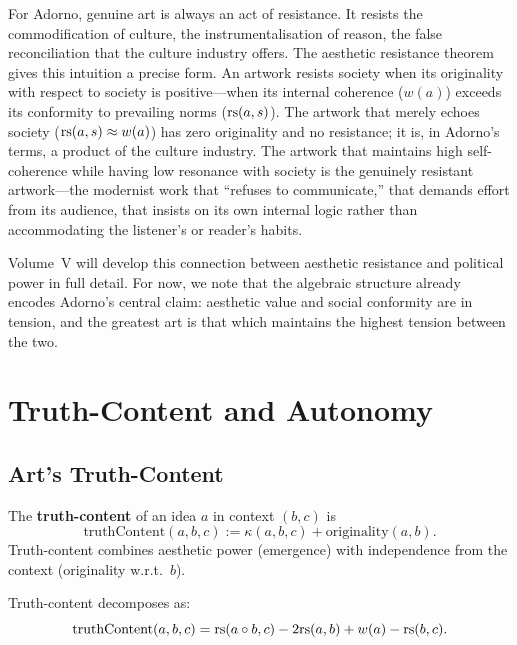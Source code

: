 \begin{interpretation}
\label{interp:adorno-resistant}
For Adorno, genuine art is always an act of resistance.  It resists the commodification of culture, the instrumentalisation of reason, the false reconciliation that the culture industry offers.  The aesthetic resistance theorem gives this intuition a precise form.  An artwork resists society when its originality with respect to society is positive---when its internal coherence ($w(a)$) exceeds its conformity to prevailing norms ($\mathrm{rs}(a, s)$).  The artwork that merely echoes society ($\mathrm{rs}(a, s) \approx w(a)$) has zero originality and no resistance; it is, in Adorno's terms, a product of the culture industry.  The artwork that maintains high self-coherence while having low resonance with society is the genuinely resistant artwork---the modernist work that ``refuses to communicate,'' that demands effort from its audience, that insists on its own internal logic rather than accommodating the listener's or reader's habits.

Volume~V will develop this connection between aesthetic resistance and political power in full detail.  For now, we note that the algebraic structure already encodes Adorno's central claim: aesthetic value and social conformity are in tension, and the greatest art is that which maintains the highest tension between the two.
\end{interpretation}

\section{Truth-Content and Autonomy}
\label{sec:adorno:truth}

\subsection{Art's Truth-Content}

\begin{definition}
\label{def:truth-content}
The \textbf{truth-content} of an idea $a$ in context $(b, c)$ is
\[
  \mathrm{truthContent}(a, b, c)
    := \kappa(a, b, c) + \mathrm{originality}(a, b).
\]
Truth-content combines aesthetic power (emergence) with independence from
the context (originality w.r.t.\ $b$).
\end{definition}

\begin{theorem}
\label{thm:truth-decompose}
Truth-content decomposes as:
\[
  \mathrm{truthContent}(a, b, c)
    = \mathrm{rs}(a \circ b, c) - 2\mathrm{rs}(a, b) + w(a) - \mathrm{rs}(b, c).
\]
\end{theorem}

